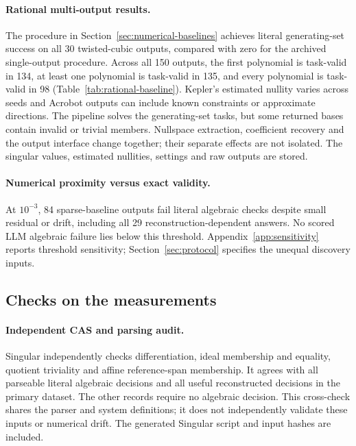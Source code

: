 \documentclass[10pt]{article}
\begin{document}
\paragraph{Rational multi-output results.} The procedure in Section~\ref{sec:numerical-baselines} achieves literal generating-set success on all 30 twisted-cubic outputs, compared with zero for the archived single-output procedure. Across all 150 outputs, the first polynomial is task-valid in 134, at least one polynomial is task-valid in 135, and every polynomial is task-valid in 98 (Table~\ref{tab:rational-baseline}). Kepler's estimated nullity varies across seeds and Acrobot outputs can include known constraints or approximate directions. The pipeline solves the generating-set tasks, but some returned bases contain invalid or trivial members. Nullspace extraction, coefficient recovery and the output interface change together; their separate effects are not isolated. The singular values, estimated nullities, settings and raw outputs are stored.

\begin{table}[!htbp]
\centering\small
\tabRationalBaseline
\caption{Numerical baseline with rational recovery, 15 seeds per system. Conservation rows compare first, any and all returned nontrivial conserved polynomials. Generating-set rows assess the complete returned set under every column, rather than accepting a single member.}
\label{tab:rational-baseline}
\end{table}

\paragraph{Numerical proximity versus exact validity.} At $10^{-3}$, 84 sparse-baseline outputs fail literal algebraic checks despite small residual or drift, including all 29 reconstruction-dependent answers. No scored LLM algebraic failure lies below this threshold. Appendix~\ref{app:sensitivity} reports threshold sensitivity; Section~\ref{sec:protocol} specifies the unequal discovery inputs.

\subsection{Checks on the measurements}

\paragraph{Independent CAS and parsing audit.} Singular independently checks differentiation, ideal membership and equality, quotient triviality and affine reference-span membership. It agrees with all \nCASLiteral{} parseable literal algebraic decisions and all \nCASReconstructed{} useful reconstructed decisions in the primary dataset. The other \nCASNonalgebraic{} records require no algebraic decision. This cross-check shares the parser and system definitions; it does not independently validate these inputs or numerical drift. The generated Singular script and input hashes are included.
\end{document}
